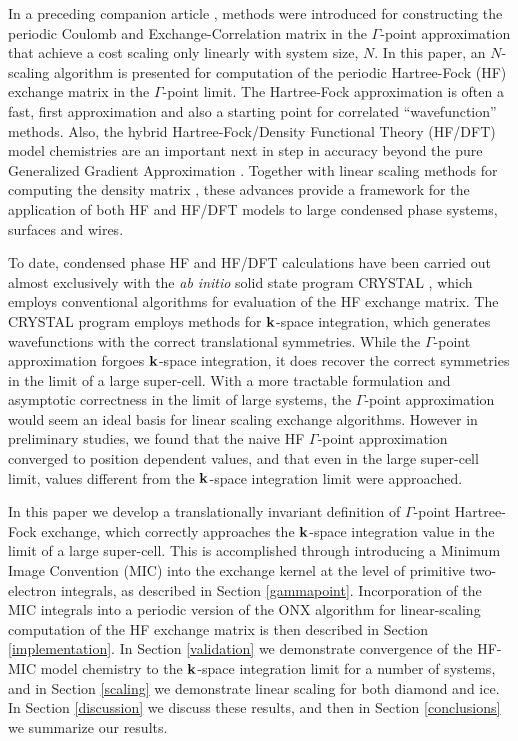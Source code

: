 \documentclass[prb,aps,nobibnotes,twocolumn,doublespace,twocolumngrid,superbib,showpacs]{revtex4}
\begin{document}
In a preceding companion article \cite{CTymczak04A},  methods were introduced for constructing 
the periodic Coulomb and Exchange-Correlation matrix in the $\Gamma$-point approximation that 
achieve  a cost  scaling only linearly with system size, $N$.  In this paper, an $N$-scaling 
algorithm is presented for computation of the periodic Hartree-Fock (HF) exchange matrix in the 
$\Gamma$-point limit.   The Hartree-Fock approximation is often a fast, first 
approximation and also a starting point for correlated ``wavefunction'' methods.  
Also, the hybrid Hartree-Fock/Density Functional Theory (HF/DFT) model chemistries are an important next 
in step in accuracy beyond the pure Generalized Gradient Approximation \cite{Gill92,Becke93,VBarone96,CAdamo99}.
Together with linear scaling methods for computing the density matrix \cite{ANiklasson02A,ANiklasson03}, these 
advances provide a framework for the application of both HF and HF/DFT models to large condensed 
phase systems, surfaces and wires.   

To date, condensed phase HF and HF/DFT calculations have been carried out almost 
exclusively with the {\em ab initio} solid state program {\sc CRYSTAL} \cite{RDovesi00}, 
which employs conventional  algorithms for evaluation of the 
HF exchange matrix.  The {\sc CRYSTAL} program employs methods for ${\bf k}$-space integration, 
which generates wavefunctions with the correct translational symmetries.   While the  
$\Gamma$-point approximation forgoes ${\bf k}$-space integration, it does recover the correct 
symmetries in the limit of a large super-cell.  With a more tractable formulation and asymptotic 
correctness in the limit of large systems,  the $\Gamma$-point  approximation would seem an 
ideal basis for linear scaling exchange algorithms.   However in preliminary studies, we found 
that the naive HF $\Gamma$-point approximation converged to position dependent values, and that 
even in the large super-cell limit,  values different from the ${\bf k}$-space integration limit were approached.

In this paper we develop a translationally invariant definition of $\Gamma$-point 
Hartree-Fock exchange, which correctly approaches the ${\bf k}$-space integration value
in the limit of a large super-cell.  This is accomplished through introducing a Minimum 
Image Convention (MIC) into the exchange kernel at the level of primitive two-electron integrals,  
as described in Section \ref{gammapoint}.  Incorporation of the MIC integrals into a periodic 
version of the {\sc ONX} algorithm \cite{ESchwegler97} for linear-scaling computation of the HF 
exchange matrix is then described in Section \ref{implementation}.  In Section \ref{validation} 
we demonstrate convergence of the HF-MIC model chemistry to the $\bf k$-space integration 
limit for a number of systems, and in Section \ref{scaling} we demonstrate linear scaling
for both diamond and ice.  In Section \ref{discussion} we discuss these results,
and then in Section \ref{conclusions} we summarize our results.
\end{document}
